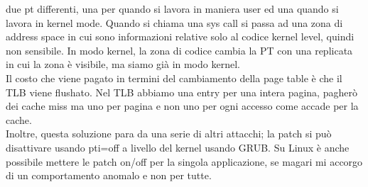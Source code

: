\documentclass[14pt]{article}
\begin{document}
due pt differenti, una per quando si lavora in maniera user ed una quando si lavora in kernel mode. Quando si chiama una sys call si passa ad una zona di address space in cui sono informazioni relative solo al codice kernel level, quindi non sensibile. In modo kernel, la zona di codice cambia la PT con una replicata in cui la zona è visibile, ma siamo già in modo kernel.\\ Il costo che viene pagato in termini del cambiamento della page table è che il TLB viene flushato. Nel TLB abbiamo una entry per una intera pagina, pagherò dei cache miss ma uno per pagina e non uno per ogni accesso come accade per la cache.\\ Inoltre, questa soluzione para da una serie di altri attacchi; la patch si può disattivare usando \textsf{pti=off} a livello del kernel usando GRUB. Su Linux è anche possibile mettere le patch on/off per la singola applicazione, se magari mi accorgo di un comportamento anomalo e non per tutte.
\end{document}
